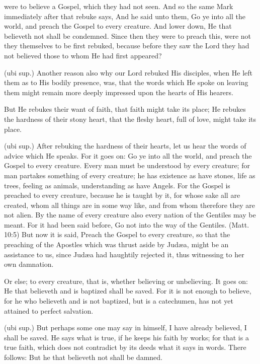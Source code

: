were to believe a Gospel, which they had not seen. And so the same Mark immediately after that rebuke says, And he said unto them, Go ye into all the world, and preach the Gospel to every creature. And lower down, He that believeth not shall be condemned. Since then they were to preach this, were not they themselves to be first rebuked, because before they saw the Lord they had not believed those to whom He had first appeared?

 (ubi sup.) Another reason also why our Lord rebuked His disciples, when He left them as to His bodily presence, was, that the words which He spoke on leaving them might remain more deeply impressed upon the hearts of His hearers.

 But He rebukes their want of faith, that faith might take its place; He rebukes the hardness of their stony heart, that the fleshy heart, full of love, might take its place.

 (ubi sup.) After rebuking the hardness of their hearts, let us hear the words of advice which He speaks. For it goes on: Go ye into all the world, and preach the Gospel to every creature. Every man must be understood by every creature; for man partakes something of every creature; he has existence as have stones, life as trees, feeling as animals, understanding as have Angels. For the Gospel is preached to every creature, because he is taught by it, for whose sake all are created, whom all things are in some way like, and from whom therefore they are not alien. By the name of every creature also every nation of the Gentiles may be meant. For it had been said before, Go not into the way of the Gentiles. (Matt. 10:5) But now it is said, Preach the Gospel to every creature, so that the preaching of the Apostles which was thrust aside by Judæa, might be an assistance to us, since Judæa had haughtily rejected it, thus witnessing to her own damnation.

 Or else; to every creature, that is, whether believing or unbelieving. It goes on: He that believeth and is baptized shall be saved. For it is not enough to believe, for he who believeth and is not baptized, but is a catechumen, has not yet attained to perfect salvation.

 (ubi sup.) But perhaps some one may say in himself, I have already believed, I shall be saved. He says what is true, if he keeps his faith by works; for that is a true faith, which does not contradict by its deeds what it says in words. There follows: But he that believeth not shall be damned.

